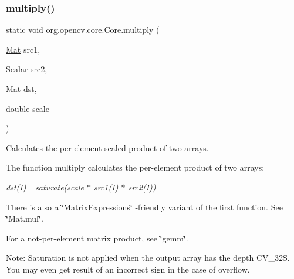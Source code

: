 \subsubsection{\texorpdfstring{multiply()}{multiply()}\hspace{0.1cm}{\footnotesize\ttfamily [5/6]}}
{\footnotesize\ttfamily static void org.\+opencv.\+core.\+Core.\+multiply (\begin{DoxyParamCaption}\item[{\mbox{\hyperlink{classorg_1_1opencv_1_1core_1_1_mat}{Mat}}}]{src1,  }\item[{\mbox{\hyperlink{classorg_1_1opencv_1_1core_1_1_scalar}{Scalar}}}]{src2,  }\item[{\mbox{\hyperlink{classorg_1_1opencv_1_1core_1_1_mat}{Mat}}}]{dst,  }\item[{double}]{scale }\end{DoxyParamCaption})\hspace{0.3cm}{\ttfamily [static]}}

Calculates the per-\/element scaled product of two arrays.

The function {\ttfamily multiply} calculates the per-\/element product of two arrays\+:

{\itshape dst(\+I)= saturate(scale $\ast$ src1(\+I) $\ast$ src2(\+I))}

There is also a \char`\"{}\+Matrix\+Expressions\char`\"{} -\/friendly variant of the first function. See \char`\"{}\+Mat.\+mul\char`\"{}.

For a not-\/per-\/element matrix product, see \char`\"{}gemm\char`\"{}.

Note\+: Saturation is not applied when the output array has the depth {\ttfamily C\+V\+\_\+32S}. You may even get result of an incorrect sign in the case of overflow.


